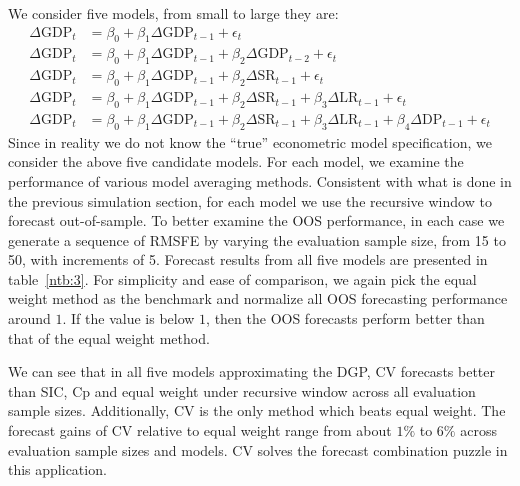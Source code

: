 We consider five models, from small to large they are:
\begin{subequations}
\begin{align}
\Delta\mathrm{GDP}_{t} & = \beta_{0} + \beta_{1}\Delta\mathrm{GDP}_{t-1} + \epsilon_{t} \label{md:1}\\
\Delta\mathrm{GDP}_{t} & = \beta_{0} + \beta_{1}\Delta\mathrm{GDP}_{t-1} + \beta_{2}\Delta\mathrm{GDP}_{t-2} + \epsilon_{t}\label{md:2} \\
\Delta\mathrm{GDP}_{t} & = \beta_{0} + \beta_{1}\Delta\mathrm{GDP}_{t-1} + \beta_{2}\Delta\mathrm{SR}_{t-1} + \epsilon_{t}\label{md:3} \\
\Delta\mathrm{GDP}_{t} & = \beta_{0} + \beta_{1}\Delta\mathrm{GDP}_{t-1} + \beta_{2}\Delta\mathrm{SR}_{t-1} + \beta_{3}\Delta\mathrm{LR}_{t-1} + \epsilon_{t}\label{md:4} \\
\Delta\mathrm{GDP}_{t} & = \beta_{0} + \beta_{1}\Delta\mathrm{GDP}_{t-1} + \beta_{2}\Delta\mathrm{SR}_{t-1} + \beta_{3}\Delta\mathrm{LR}_{t-1} + \beta_{4}\Delta\mathrm{DP}_{t-1} + \epsilon_{t}\label{md:5}
\end{align}
\end{subequations}
Since in reality we do not know the ``true'' econometric model specification, we consider the above five candidate models. For each model, we examine the performance of various model averaging methods. Consistent with what is done in the previous simulation section, for each model we use the recursive window to forecast out-of-sample. To better examine the OOS performance, in each case we generate a sequence of RMSFE by varying the evaluation sample size, from 15 to 50, with increments of 5. Forecast results from all five models are presented in table~\ref{ntb:3}. For simplicity and ease of comparison, we again pick the equal weight method as the benchmark and normalize all OOS forecasting performance around $1$. If the value is below $1$, then the OOS forecasts perform better than that of the equal weight method.

We can see that in all five models approximating the DGP, CV forecasts better than SIC, Cp and equal weight under recursive window across all evaluation sample sizes. Additionally, CV is the only method which beats equal weight. The forecast gains of CV relative to equal weight range from about $1\%$ to $6\%$ across evaluation sample sizes and models. CV solves the forecast combination puzzle in this application.

